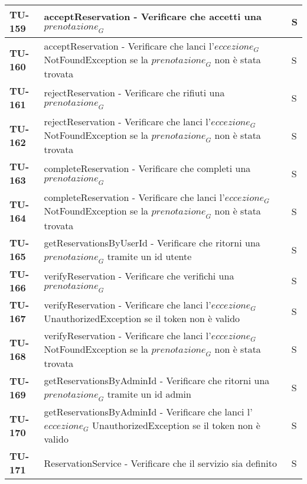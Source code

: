\begin{longtable}{|>{\centering\arraybackslash}p{2cm}|p{15cm}|p{1cm}|}
  \hline
  \rowcolor{gray!10}
  \textbf{TU-159} & acceptReservation - Verificare che accetti una $\textit{prenotazione}_G$ & S \\ 
  \hline
  \rowcolor{gray!10}
  \textbf{TU-160} & acceptReservation - Verificare che lanci l'$\textit{eccezione}_G$ NotFoundException se la $\textit{prenotazione}_G$ non è stata trovata & S \\ 
  \hline
  \rowcolor{gray!10}
  \textbf{TU-161} & rejectReservation - Verificare che rifiuti una $\textit{prenotazione}_G$ & S \\ 
  \hline
  \rowcolor{gray!10}
  \textbf{TU-162} & rejectReservation - Verificare che lanci l'$\textit{eccezione}_G$ NotFoundException se la $\textit{prenotazione}_G$ non è stata trovata & S \\ 
  \hline
  \rowcolor{gray!10}
  \textbf{TU-163} & completeReservation - Verificare che completi una $\textit{prenotazione}_G$ & S \\ 
  \hline
  \rowcolor{gray!10}
  \textbf{TU-164} & completeReservation - Verificare che lanci l'$\textit{eccezione}_G$ NotFoundException se la $\textit{prenotazione}_G$ non è stata trovata & S \\ 
  \hline
  \rowcolor{gray!10}
  \textbf{TU-165} & getReservationsByUserId - Verificare che ritorni una $\textit{prenotazione}_G$ tramite un id utente & S \\ 
  \hline
  \rowcolor{gray!10}
  \textbf{TU-166} & verifyReservation - Verificare che verifichi una $\textit{prenotazione}_G$ & S \\ 
  \hline
  \rowcolor{gray!10}
  \textbf{TU-167} & verifyReservation - Verificare che lanci l'$\textit{eccezione}_G$ UnauthorizedException se il token non è valido & S \\ 
  \hline
  \rowcolor{gray!10}
  \textbf{TU-168} & verifyReservation - Verificare che lanci l'$\textit{eccezione}_G$ NotFoundException se la $\textit{prenotazione}_G$ non è stata trovata & S \\ 
  \hline
  \rowcolor{gray!10}
  \textbf{TU-169} & getReservationsByAdminId - Verificare che ritorni una $\textit{prenotazione}_G$ tramite un id admin & S \\ 
  \hline
  \rowcolor{gray!10}
  \textbf{TU-170} & getReservationsByAdminId - Verificare che lanci l'$\textit{eccezione}_G$ UnauthorizedException se il token non è valido & S \\ 
  \hline
  \rowcolor{gray!10}
  \textbf{TU-171} & ReservationService - Verificare che il servizio sia definito & S \\ 

\end{longtable}

